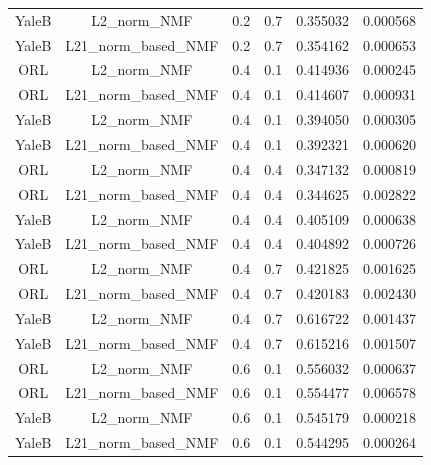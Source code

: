 \begin{table}[p]
\begin{tabular}{cccccc}
YaleB            & L2\_norm\_NMF         & 0.2        & 0.7        & 0.355032           & 0.000568          \\
YaleB            & L21\_norm\_based\_NMF & 0.2        & 0.7        & 0.354162           & 0.000653          \\
ORL              & L2\_norm\_NMF         & 0.4        & 0.1        & 0.414936           & 0.000245          \\
ORL              & L21\_norm\_based\_NMF & 0.4        & 0.1        & 0.414607           & 0.000931          \\
YaleB            & L2\_norm\_NMF         & 0.4        & 0.1        & 0.394050           & 0.000305          \\
YaleB            & L21\_norm\_based\_NMF & 0.4        & 0.1        & 0.392321           & 0.000620          \\
ORL              & L2\_norm\_NMF         & 0.4        & 0.4        & 0.347132           & 0.000819          \\
ORL              & L21\_norm\_based\_NMF & 0.4        & 0.4        & 0.344625           & 0.002822          \\
YaleB            & L2\_norm\_NMF         & 0.4        & 0.4        & 0.405109           & 0.000638          \\
YaleB            & L21\_norm\_based\_NMF & 0.4        & 0.4        & 0.404892           & 0.000726          \\
ORL              & L2\_norm\_NMF         & 0.4        & 0.7        & 0.421825           & 0.001625          \\
ORL              & L21\_norm\_based\_NMF & 0.4        & 0.7        & 0.420183           & 0.002430          \\
YaleB            & L2\_norm\_NMF         & 0.4        & 0.7        & 0.616722           & 0.001437          \\
YaleB            & L21\_norm\_based\_NMF & 0.4        & 0.7        & 0.615216           & 0.001507          \\
ORL              & L2\_norm\_NMF         & 0.6        & 0.1        & 0.556032           & 0.000637          \\
ORL              & L21\_norm\_based\_NMF & 0.6        & 0.1        & 0.554477           & 0.006578          \\
YaleB            & L2\_norm\_NMF         & 0.6        & 0.1        & 0.545179           & 0.000218          \\
YaleB            & L21\_norm\_based\_NMF & 0.6        & 0.1        & 0.544295           & 0.000264          \\

\end{tabular}
\end{table}
